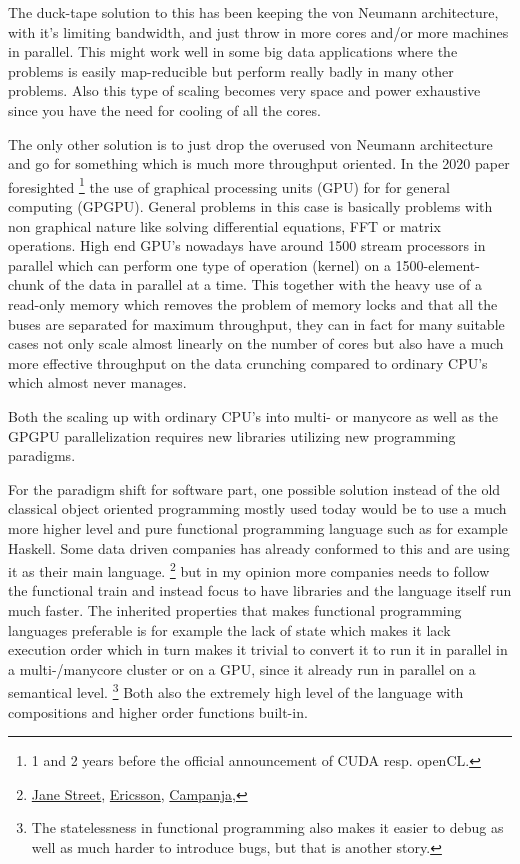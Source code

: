 \documentclass{article}
\begin{document}
    The duck-tape solution to this has been keeping the von Neumann
    architecture, with it's limiting bandwidth, and just throw in more cores and/or more machines in parallel.
    This might work well in some big data applications where the problems is easily
    map-reducible but perform really badly in many other
    problems.\cite{mapreduce} Also
    this type of scaling becomes very space and power exhaustive since you have the need for
    cooling of all the cores. 

    The only other solution is to just drop the overused von Neumann architecture
    and go for something which is much more throughput oriented. In the 2020
    paper\cite{ms2020} foresighted
    \footnote{1 and 2 years before the official 
    announcement of CUDA resp. openCL.} 
    the use of graphical processing units (GPU) for
    for general computing (GPGPU). General problems in this case is basically 
    problems with non graphical nature like
    solving differential equations, FFT or matrix operations. 
    High end GPU's nowadays have around
    1500 stream processors in parallel which can perform one type of
    operation
    (kernel)
    on a 1500-element-chunk of the data in parallel at a time. This together
    with the heavy use 
    of a read-only memory which removes the problem of memory locks
    and that all the buses are separated for
    maximum throughput, they can in fact for many suitable cases not only scale almost linearly 
    on the number of cores but also have a much more effective throughput on
    the data crunching compared to ordinary CPU's which almost never manages.

    Both the scaling up with ordinary CPU's into multi- or manycore as well as
    the GPGPU parallelization requires new libraries utilizing new programming paradigms.

    For the paradigm shift for software part,
    one possible solution instead of the old classical object oriented
    programming mostly used today would be to use a much more higher level and
    pure functional programming language such as
    for example Haskell. Some data driven companies has
    already conformed to this and are using it as their main language.
    \footnote{
        \href{http://www.janestreet.com}{Jane Street},
        \href{http://www.ericsson.com}{Ericsson},
        \href{http://www.campanja.com}{Campanja},
    }
    but in my opinion more companies needs to follow the functional train and
    instead focus to have libraries and the language itself run much faster.
    The inherited properties that makes functional programming languages 
    preferable is for example the lack of state 
    which makes it lack execution order which in turn makes it
    trivial to convert it to run it in parallel in a multi-/manycore cluster
    or on a GPU, since it already run in parallel on a semantical level.
    \footnote{The
    statelessness in functional programming also makes it easier to debug as
    well as much harder to introduce bugs, but that is another story.} 
    Both also the extremely high level of the language with
    compositions and higher order functions built-in.\cite{haskell}
\end{document}
